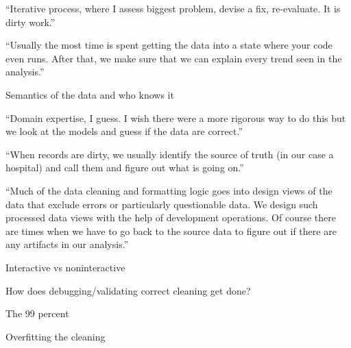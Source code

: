 “Iterative process, where I assess biggest problem, devise a fix, re-evaluate. It is dirty work.”

“Usually the most time is spent getting the data into a state where your code even runs. After that, we make sure that we can explain every trend seen in the analysis.”

Semantics of the data and who knows it

“Domain expertise, I guess. I wish there were a more rigorous way to do this but we look at the models and guess if the data are correct.”

“When records are dirty, we usually identify the source of truth (in our case a hospital) and call them and figure out what is going on.”

“Much of the data cleaning and formatting logic goes into design views of the data that exclude errors or particularly questionable data. We design such processed data views with the help of development operations. Of course there are times when we have to go back to the source data to figure out if there are any artifacts in our analysis.”





Interactive vs noninteractive

How does debugging/validating correct cleaning get done?

The 99 percent

Overfitting the cleaning
